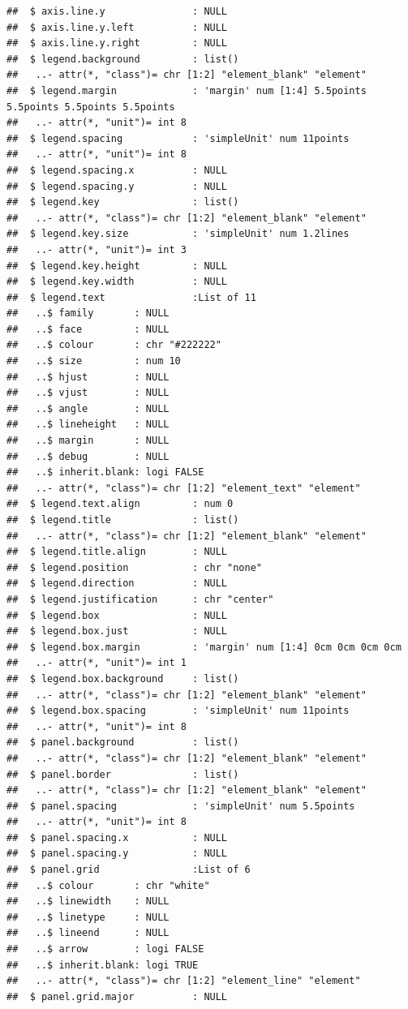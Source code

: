 \documentclass[12pt,preprint, authoryear]{elsarticle}
\numberwithin{equation}{section}
\numberwithin{figure}{section}
\numberwithin{table}{section}
\begin{document}
\begin{verbatim}
##  $ axis.line.y               : NULL
##  $ axis.line.y.left          : NULL
##  $ axis.line.y.right         : NULL
##  $ legend.background         : list()
##   ..- attr(*, "class")= chr [1:2] "element_blank" "element"
##  $ legend.margin             : 'margin' num [1:4] 5.5points 5.5points 5.5points 5.5points
##   ..- attr(*, "unit")= int 8
##  $ legend.spacing            : 'simpleUnit' num 11points
##   ..- attr(*, "unit")= int 8
##  $ legend.spacing.x          : NULL
##  $ legend.spacing.y          : NULL
##  $ legend.key                : list()
##   ..- attr(*, "class")= chr [1:2] "element_blank" "element"
##  $ legend.key.size           : 'simpleUnit' num 1.2lines
##   ..- attr(*, "unit")= int 3
##  $ legend.key.height         : NULL
##  $ legend.key.width          : NULL
##  $ legend.text               :List of 11
##   ..$ family       : NULL
##   ..$ face         : NULL
##   ..$ colour       : chr "#222222"
##   ..$ size         : num 10
##   ..$ hjust        : NULL
##   ..$ vjust        : NULL
##   ..$ angle        : NULL
##   ..$ lineheight   : NULL
##   ..$ margin       : NULL
##   ..$ debug        : NULL
##   ..$ inherit.blank: logi FALSE
##   ..- attr(*, "class")= chr [1:2] "element_text" "element"
##  $ legend.text.align         : num 0
##  $ legend.title              : list()
##   ..- attr(*, "class")= chr [1:2] "element_blank" "element"
##  $ legend.title.align        : NULL
##  $ legend.position           : chr "none"
##  $ legend.direction          : NULL
##  $ legend.justification      : chr "center"
##  $ legend.box                : NULL
##  $ legend.box.just           : NULL
##  $ legend.box.margin         : 'margin' num [1:4] 0cm 0cm 0cm 0cm
##   ..- attr(*, "unit")= int 1
##  $ legend.box.background     : list()
##   ..- attr(*, "class")= chr [1:2] "element_blank" "element"
##  $ legend.box.spacing        : 'simpleUnit' num 11points
##   ..- attr(*, "unit")= int 8
##  $ panel.background          : list()
##   ..- attr(*, "class")= chr [1:2] "element_blank" "element"
##  $ panel.border              : list()
##   ..- attr(*, "class")= chr [1:2] "element_blank" "element"
##  $ panel.spacing             : 'simpleUnit' num 5.5points
##   ..- attr(*, "unit")= int 8
##  $ panel.spacing.x           : NULL
##  $ panel.spacing.y           : NULL
##  $ panel.grid                :List of 6
##   ..$ colour       : chr "white"
##   ..$ linewidth    : NULL
##   ..$ linetype     : NULL
##   ..$ lineend      : NULL
##   ..$ arrow        : logi FALSE
##   ..$ inherit.blank: logi TRUE
##   ..- attr(*, "class")= chr [1:2] "element_line" "element"
##  $ panel.grid.major          : NULL

\end{verbatim}
\end{document}
